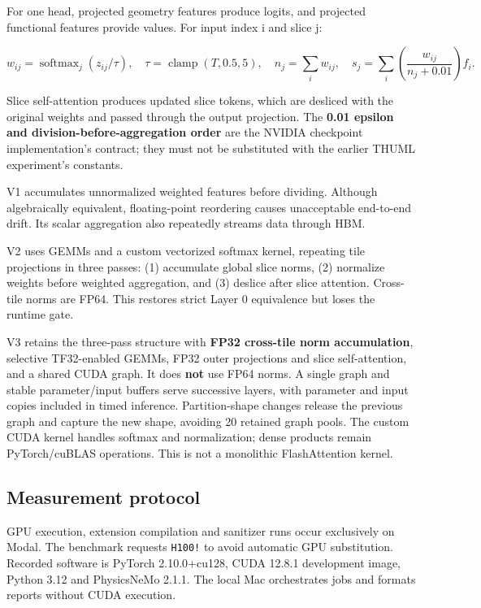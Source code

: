 \documentclass[
  10pt,
]{article}
\begin{document}
For one head, projected geometry features produce logits, and projected
functional features provide values. For input index i and slice j:

\[w_{ij}=\operatorname{softmax}_j(z_{ij}/\tau),\quad
\tau=\operatorname{clamp}(T,0.5,5),\quad
n_j=\sum_i w_{ij},\quad
s_j=\sum_i \left(\frac{w_{ij}}{n_j+0.01}\right)f_i.\]

Slice self-attention produces updated slice tokens, which are desliced
with the original weights and passed through the output projection. The
\textbf{0.01 epsilon and division-before-aggregation order} are the
NVIDIA checkpoint implementation's contract; they must not be
substituted with the earlier THUML experiment's constants.

V1 accumulates unnormalized weighted features before dividing. Although
algebraically equivalent, floating-point reordering causes unacceptable
end-to-end drift. Its scalar aggregation also repeatedly streams data
through HBM.

V2 uses GEMMs and a custom vectorized softmax kernel, repeating tile
projections in three passes: (1) accumulate global slice norms, (2)
normalize weights before weighted aggregation, and (3) deslice after
slice attention. Cross-tile norms are FP64. This restores strict Layer 0
equivalence but loses the runtime gate.

V3 retains the three-pass structure with \textbf{FP32 cross-tile norm
accumulation}, selective TF32-enabled GEMMs, FP32 outer projections and
slice self-attention, and a shared CUDA graph. It does \textbf{not} use
FP64 norms. A single graph and stable parameter/input buffers serve
successive layers, with parameter and input copies included in timed
inference. Partition-shape changes release the previous graph and
capture the new shape, avoiding 20 retained graph pools. The custom CUDA
kernel handles softmax and normalization; dense products remain
PyTorch/cuBLAS operations. This is not a monolithic FlashAttention
kernel.

\subsection{Measurement protocol}\label{measurement-protocol}

GPU execution, extension compilation and sanitizer runs occur
exclusively on Modal. The benchmark requests \texttt{H100!} to avoid
automatic GPU substitution. Recorded software is PyTorch 2.10.0+cu128,
CUDA 12.8.1 development image, Python 3.12 and PhysicsNeMo 2.1.1. The
local Mac orchestrates jobs and formats reports without CUDA execution.
\end{document}
